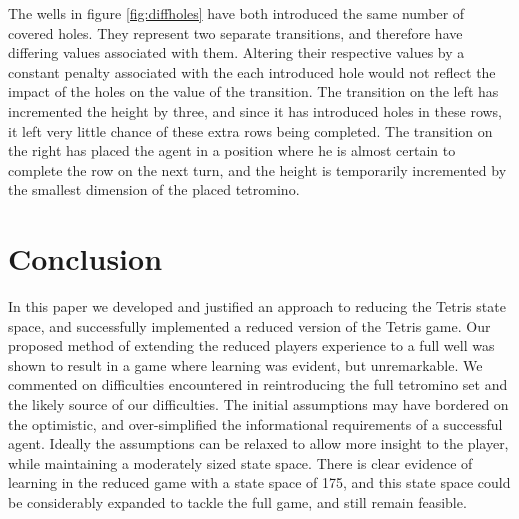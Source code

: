 \documentclass[a4paper,twocolumn]{article}
\begin{document}
The wells in figure \ref{fig:diffholes} have both introduced the same number of covered holes. They represent two separate transitions, and therefore have differing values associated with them. Altering their respective values by a constant penalty associated with the each introduced hole would not reflect the impact of the holes on the value of the transition. The transition on the left has incremented the height by three, and since it has introduced holes in these rows, it left very little chance of these extra rows being completed. The transition on the right has placed the agent in a position where he is almost certain to complete the row on the next turn, and the height is temporarily incremented by the smallest dimension of the placed tetromino.

\section{Conclusion}

In this paper we developed and justified an approach to reducing the Tetris state space, and successfully implemented a reduced version of the Tetris game. Our proposed method of extending the reduced players experience to a full well was shown to result in a game where learning was evident, but unremarkable. We commented on difficulties encountered in reintroducing the full tetromino set and the likely source of our difficulties. The initial assumptions may have bordered on the optimistic, and over-simplified the informational requirements of a successful agent. Ideally the assumptions can be relaxed to allow more insight to the player, while maintaining a moderately sized state space. There is clear evidence of learning in the reduced game with a state space of 175, and this state space could be considerably expanded to tackle the full game, and still remain feasible.




\end{document}
